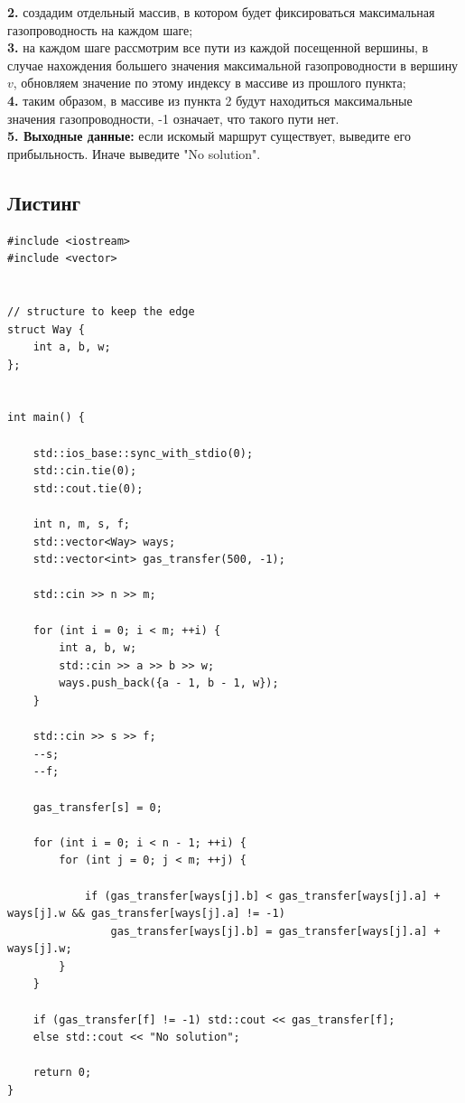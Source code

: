 \documentclass[a5paper, 10pt]{article}
\theoremstyle{definition}
\theoremstyle{plain}
\theoremstyle{remark}
\begin{document}
\textbf{2.} создадим отдельный массив, в котором будет фиксироваться максимальная газопроводность на каждом шаге; \\

\textbf{3.} на каждом шаге рассмотрим все пути из каждой посещенной вершины, в случае нахождения большего значения максимальной газопроводности в вершину $v$, обновляем значение по этому индексу в массиве из прошлого пункта; \\

\textbf{4.} таким образом, в массиве из пункта 2 будут находиться максимальные значения газопроводности, -1 означает, что такого пути нет.  \\

\textbf{5. Выходные данные:} если искомый маршрут существует, выведите его прибыльность. Иначе выведите "No solution".

\subsection{Листинг}

\begin{center}
\begin{lstlisting}[label=some-code,caption={Исходный код для 1450}]
#include <iostream>
#include <vector>


// structure to keep the edge
struct Way {
    int a, b, w;
};


int main() {

    std::ios_base::sync_with_stdio(0);
    std::cin.tie(0);
    std::cout.tie(0);

    int n, m, s, f;
    std::vector<Way> ways;
    std::vector<int> gas_transfer(500, -1);

    std::cin >> n >> m;

    for (int i = 0; i < m; ++i) {
        int a, b, w;
        std::cin >> a >> b >> w;
        ways.push_back({a - 1, b - 1, w});
    }

    std::cin >> s >> f;
    --s;
    --f;
    
    gas_transfer[s] = 0;

    for (int i = 0; i < n - 1; ++i) {
        for (int j = 0; j < m; ++j) {

            if (gas_transfer[ways[j].b] < gas_transfer[ways[j].a] + ways[j].w && gas_transfer[ways[j].a] != -1)
                gas_transfer[ways[j].b] = gas_transfer[ways[j].a] + ways[j].w;
        }
    }

    if (gas_transfer[f] != -1) std::cout << gas_transfer[f];
    else std::cout << "No solution";

    return 0;
}
\end{lstlisting}
\end{center}
\end{document}

